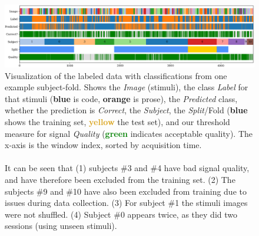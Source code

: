         \begin{landscape}
            \begin{figure}
                \centering
                \includegraphics[width=24cm]{img/timebars.png}
                \caption{Visualization of the labeled data with classifications from one example subject-fold. Shows the \emph{Image} (stimuli), the class \emph{Label} for that stimuli (\textcolor{NavyBlue}{\textbf{blue}} is code, \textcolor{BurntOrange}{\textbf{orange}} is prose), the \emph{Predicted} class, whether the prediction is \emph{Correct}, the \emph{Subject}, the \emph{Split}/Fold (\textcolor{NavyBlue}{\textbf{blue}} shows the training set, \textcolor{Goldenrod}{\textbf{yellow}} the test set), and our threshold measure for signal \emph{Quality} (\textcolor{Green}{\textbf{green}} indicates acceptable quality). The x-axis is the window index, sorted by acquisition time.
                \\
                \\
                It can be seen that (1) subjects \#3 and \#4 have bad signal quality, and have therefore been excluded from the training set. (2) The subjects \#9 and \#10 have also been excluded from training due to issues during data collection. (3) For subject \#1 the stimuli images were not shuffled. (4) Subject \#0 appears twice, as they did two sessions (using unseen stimuli).}\label{fig:timebars}
            \end{figure}
        \end{landscape}

